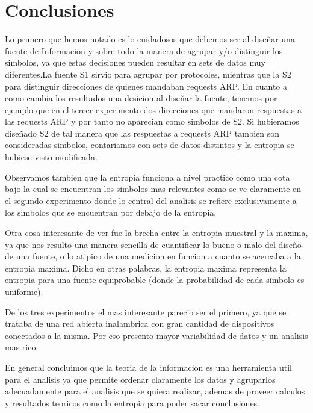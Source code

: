 \section{Conclusiones}

Lo primero que hemos notado es lo cuidadosos que debemos ser al diseñar una fuente de Informacion y sobre todo la manera de agrupar y/o distinguir los simbolos, ya que estas decisiones pueden resultar en sets de datos muy diferentes.La fuente S1 sirvio para agrupar por protocoles, mientras que la S2 para distinguir direcciones de quienes mandaban requests ARP.
En cuanto a como cambia los resultados una desicion al diseñar la fuente, tenemos por ejemplo que en el tercer experimento dos direcciones que mandaron respuestas a las requests ARP y por tanto no aparecian como simbolos de S2. Si hubieramos diseñado S2 de tal manera que las respuestas a requests ARP tambien son consideradas simbolos, contariamos con sets de datos distintos y la entropia se hubiese visto modificada.

Observamos tambien que la entropia funciona a nivel practico como una cota bajo la cual se encuentran los simbolos mas relevantes como se ve claramente en el segundo experimento donde lo central del analisis se refiere exclusivamente a los simbolos que se encuentran por debajo de la entropia.

Otra cosa interesante de ver fue la brecha entre la entropia muestral y la maxima, ya que nos resulto una manera sencilla de cuantificar lo bueno o malo del diseño de una fuente, o lo atipico de una medicion en funcion a cuanto se acercaba a la entropia maxima. Dicho en otras palabras, la entropia maxima representa la entropia para una fuente equiprobable (donde la probabilidad de cada simbolo es uniforme). 

De los tres experimentos el mas interesante parecio ser el primero, ya que se trataba de una red abierta inalambrica con gran cantidad de dispositivos conectados a la misma. Por eso presento mayor variabilidad de datos y un analisis mas rico.

En general concluimos que la teoria de la informacion es una herramienta util para el analisis ya que permite ordenar claramente los datos y agruparlos adecuadamente para el analisis que se quiera realizar, ademas de proveer calculos y resultados teoricos como la entropia para poder sacar conclusiones.